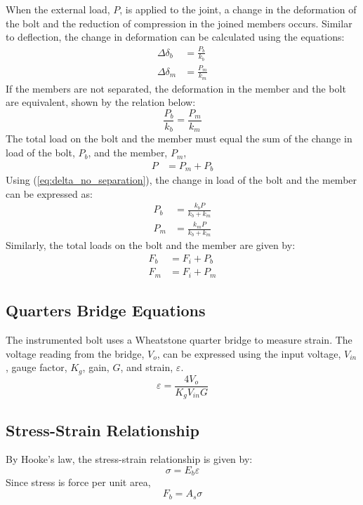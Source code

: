 When the external load, $P$, is applied to the joint, a change in the deformation of the bolt and the reduction of compression in the joined members occurs. Similar to deflection, the change in deformation can be calculated using the equations:
\begin{align}
    \Delta \delta_b &= \frac{P_b}{k_b} \label{eq:delta_delta_b} \\
    \Delta \delta_m &= \frac{P_m}{k_m} \label{eq:delta_delta_m}
\end{align}
If the members are not separated, the deformation in the member and the bolt are equivalent, shown by the relation below:
\begin{equation}
    \frac{P_b}{k_b} = \frac{P_m}{k_m} \label{eq:delta_no_separation}
\end{equation}
The total load on the bolt and the member must equal the sum of the change in load of the bolt, $P_b$, and the member, $P_m$, 
\begin{align*}
    P &= P_m + P_b 
\end{align*}
Using (\ref{eq:delta_no_separation}), the change in load of the bolt and the member can be expressed as:
\begin{align}
    P_b &= \frac{k_bP}{k_b+k_m} \label{eq:P_b} \\
    P_m &= \frac{k_mP}{k_b+k_m} \label{eq:P_m}
\end{align}
Similarly, the total loads on the bolt and the member are given by:
\begin{align}
    F_b &= F_i + P_b \label{eq:F_b} \\
    F_m &= F_i + P_m \label{eq:F_m}
\end{align}

\subsection{Quarters Bridge Equations}
The instrumented bolt uses a Wheatstone quarter bridge to measure strain. The voltage reading from the bridge, $V_o$, can be expressed using the input voltage, $V_{in}$, gauge factor, $K_g$, gain, $G$, and strain, $\varepsilon$.
\begin{equation}
    \varepsilon = \frac{4V_o}{K_gV_{in}G} \label{eq:strain_bridge}
\end{equation}

\subsection{Stress-Strain Relationship}
By Hooke's law, the stress-strain relationship is given by:
\begin{equation}
    \sigma = E_b\varepsilon \label{eq:stress_strain}
\end{equation}
Since stress is force per unit area, 
\begin{equation}
    F_b = A_s\sigma \label{eq:force_area}
\end{equation}

